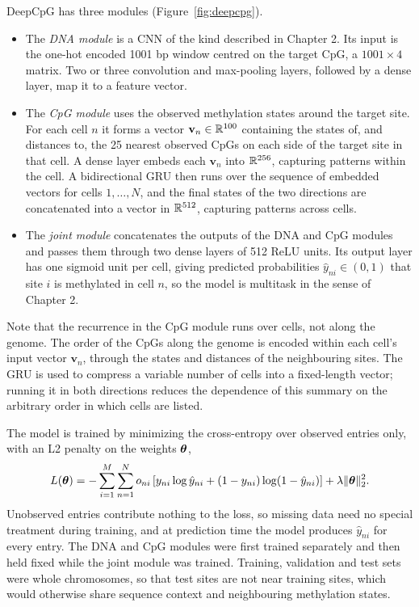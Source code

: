 DeepCpG has three modules (Figure~\ref{fig:deepcpg}).
\begin{itemize}
  \item The \emph{DNA module} is a CNN of the kind described in Chapter 2. Its input is the one-hot encoded 1001 bp window centred on the target CpG, a $1001\times4$ matrix. Two or three convolution and max-pooling layers, followed by a dense layer, map it to a feature vector.
  \item The \emph{CpG module} uses the observed methylation states around the target site. For each cell $n$ it forms a vector $\mathbf{v}_n\in\mathbb{R}^{100}$ containing the states of, and distances to, the 25 nearest observed CpGs on each side of the target site in that cell. A dense layer embeds each $\mathbf{v}_n$ into $\mathbb{R}^{256}$, capturing patterns within the cell. A bidirectional GRU then runs over the sequence of embedded vectors for cells $1,\dots,N$, and the final states of the two directions are concatenated into a vector in $\mathbb{R}^{512}$, capturing patterns across cells.
  \item The \emph{joint module} concatenates the outputs of the DNA and CpG modules and passes them through two dense layers of 512 ReLU units. Its output layer has one sigmoid unit per cell, giving predicted probabilities $\hat y_{ni}\in(0,1)$ that site $i$ is methylated in cell $n$, so the model is multitask in the sense of Chapter 2.
\end{itemize}
Note that the recurrence in the CpG module runs over cells, not along the genome. The order of the CpGs along the genome is encoded within each cell's input vector $\mathbf{v}_n$, through the states and distances of the neighbouring sites. The GRU is used to compress a variable number of cells into a fixed-length vector; running it in both directions reduces the dependence of this summary on the arbitrary order in which cells are listed.

The model is trained by minimizing the cross-entropy over observed entries only, with an L2 penalty on the weights $\boldsymbol{\theta}$,
\begin{equation}
  L(\boldsymbol{\theta}) = -\sum_{i=1}^M\sum_{n=1}^N o_{ni}\left[y_{ni}\log\hat y_{ni} + (1-y_{ni})\log(1-\hat y_{ni})\right] + \lambda\|\boldsymbol{\theta}\|_2^2 .
\end{equation}
Unobserved entries contribute nothing to the loss, so missing data need no special treatment during training, and at prediction time the model produces $\hat y_{ni}$ for every entry. The DNA and CpG modules were first trained separately and then held fixed while the joint module was trained. Training, validation and test sets were whole chromosomes, so that test sites are not near training sites, which would otherwise share sequence context and neighbouring methylation states.

